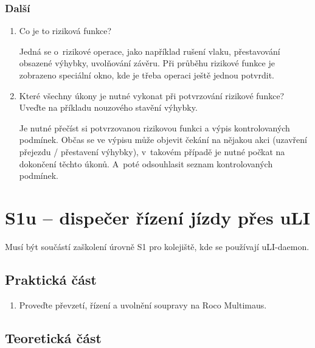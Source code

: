 \documentclass[12pt,a4paper]{article}
\def\solution#1{\ifsolution \par{\color{gray}#1}\fi}
\begin{document}
\subsubsection*{Další}
\begin{enumerate}[leftmargin=*]
\item Co je to riziková funkce?
\solution{Jedná se o~rizikové operace, jako například rušení vlaku,
přestavování obsazené výhybky, uvolňování závěru. Při průběhu rizikové funkce
je zobrazeno speciální okno, kde je třeba operaci ještě jednou potvrdit.}

\item Které všechny úkony je nutné vykonat při potvrzování rizikové funkce?
Uveďte na příkladu nouzového stavění výhybky.
\solution{Je nutné přečíst si potvrzovanou rizikovou funkci a výpis
kontrolovaných podmínek. Občas se ve výpisu může objevit čekání na nějakou
akci (uzavření přejezdu / přestavení výhybky), v~takovém případě je nutné
počkat na dokončení těchto úkonů. A~poté odsouhlasit seznam kontrolovaných
podmínek.}

\end{enumerate}


\newpage
\section{S1u – dispečer řízení jízdy přes uLI}

Musí být součástí zaškolení úrovně S1 pro kolejiště, kde se používají
uLI-daemon.

\subsection{Praktická část}

\begin{enumerate}[leftmargin=*]
\item Proveďte převzetí, řízení a uvolnění soupravy na Roco Multimaus.
\end{enumerate}

\subsection{Teoretická část}
\end{document}
